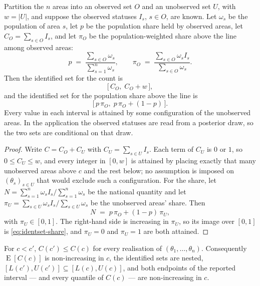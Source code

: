 \begin{lemma}
\label{lem:identified}
Partition the $n$ areas into an observed set $O$ and an unobserved set $U$,
with $w=|U|$, and suppose the observed statuses $I_s$, $s\in O$, are known.
Let $\omega_s$ be the population of area $s$, let $p$ be the population share
held by observed areas, let $C_O = \sum_{s\in O} I_s$, and let $\pi_O$ be the
population-weighted share above the line among observed areas:
\[
  p \;=\; \frac{\sum_{s\in O}\omega_s}{\sum_{s=1}^{n}\omega_s},
  \qquad
  \pi_O \;=\; \frac{\sum_{s\in O}\omega_s I_s}{\sum_{s\in O}\omega_s}.
\]
Then the identified set for the count is
\begin{equation}
  \bigl[\,C_O,\; C_O + w\,\bigr],
  \label{eq:identset-count}
\end{equation}
and the identified set for the population share above the line is
\begin{equation}
  \bigl[\,p\,\pi_O,\; p\,\pi_O + (1-p)\,\bigr].
  \label{eq:identset-share}
\end{equation}
Every value in each interval is attained by some configuration of the
unobserved areas.  In the application the observed statuses are read from a
posterior draw, so the two sets are conditional on that draw.
\end{lemma}

\begin{proof}
Write $C = C_O + C_U$ with $C_U = \sum_{s\in U} I_s$.  Each term of $C_U$ is
$0$ or $1$, so $0 \le C_U \le w$, and every integer in $[0,w]$ is attained by
placing exactly that many unobserved areas above $c$ and the rest below; no
assumption is imposed on $(\theta_s)_{s\in U}$ that would exclude such a
configuration.  For the share, let
$N = \sum_{s=1}^{n}\omega_s I_s / \sum_{s=1}^{n}\omega_s$ be the national
quantity and let $\pi_U = \sum_{s\in U}\omega_s I_s / \sum_{s\in U}\omega_s$
be the unobserved areas' share.  Then
\[
  N \;=\; p\,\pi_O + (1-p)\,\pi_U ,
\]
with $\pi_U \in [0,1]$.  The right-hand side is increasing in $\pi_U$, so its
image over $[0,1]$ is \eqref{eq:identset-share}, and $\pi_U=0$ and $\pi_U=1$
are both attained.
\end{proof}

\begin{proposition}
\label{prop:monotone}
For $c < c'$, $C(c') \le C(c)$ for every realisation of
$(\theta_1,\dots,\theta_n)$.  Consequently $\operatorname{E}[C(c)]$ is
non-increasing in $c$, the identified sets are nested,
$[L(c'),U(c')] \subseteq [L(c),U(c)]$, and both endpoints of the reported
interval --- and every quantile of $C(c)$ --- are non-increasing in $c$.
\end{proposition}

